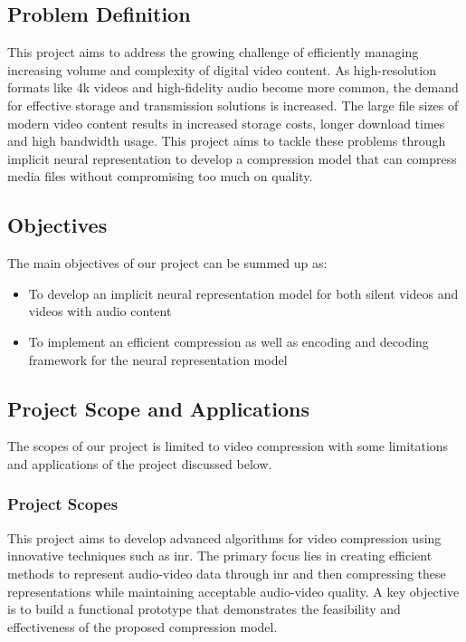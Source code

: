 \documentclass{ioereport}
\begin{document}
    \subsection{Problem Definition}
    This project aims to address the growing challenge of efficiently managing increasing volume and complexity of digital video content. As high-resolution formats like 4k videos and high-fidelity audio become more common, the demand for effective storage and transmission solutions is increased. The large file sizes of modern video content results in increased storage costs, longer download times and high bandwidth usage. This project aims to tackle these problems through implicit neural representation to develop a compression model that can compress media files without compromising too much on quality.
    
    \subsection{Objectives}
    The main objectives of our project can be summed up as:
    \begin{itemize}
        \item To develop an implicit neural representation model for both silent videos and videos with audio content
        
        \item To implement an efficient compression as well as encoding and decoding framework for the neural representation model

    \end{itemize}

    
    \subsection{Project Scope and Applications}
    The scopes of our project is limited to video compression with some limitations and applications of the project discussed below.
        \subsubsection{Project Scopes}
        This project aims to develop advanced algorithms for video compression using innovative techniques such as \gls{inr}. The primary focus lies in creating efficient methods to represent audio-video data through \gls{inr} and then compressing these representations while maintaining acceptable audio-video quality. A key objective is to build a functional prototype that demonstrates the feasibility and effectiveness of the proposed compression model.
        
\end{document}

